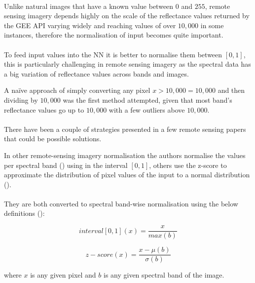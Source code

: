 \paragraph{}
Unlike natural images that have a known value between $0$ and $255$, remote sensing imagery depends highly on the scale of the reflectance values returned by the \gls{GEE} API varying widely and reaching values of over  $10,000$ in some instances, therefore the normalisation of input becomes quite important.

\paragraph{}
To feed input values into the \gls{NN} it is better to normalise them between $[0,1]$, this is particularly challenging in remote sensing imagery as the spectral data has a big variation of reflectance values across bands and images. 

A na\"ive approach of simply converting any pixel $x>10,000 =10,000$ and then dividing by $10,000$ was the first method attempted, given that most band's reflectance values go up to $10,000$ with a few outliers above $10,000$.
\paragraph{}
There have been a couple of strategies presented in a few remote sensing papers that could be possible solutions.

In other remote-sensing imagery normalisation the authors normalise the values per spectral band (\cite{8516352}) using in the interval $[0,1]$, others use the z-score to
approximate the distribution of pixel values of the input to a normal distribution (\cite{Zhong2017SatCNNSI}). 
\paragraph{}
They are both converted to spectral band-wise normalisation using the below definitions (\cite{BELENGUERPLOMER2021112468}):

\begin{equation} \label{eq_interval}
interval [0,1](x) = \frac{x}{max(b)}
\end{equation}

\begin{equation} \label{eq_z_score}
z-score(x) = \frac{x- \mu(b)}{\sigma(b)}
\end{equation}

where $x$ is any given pixel and $b$ is any given spectral band of the image.

